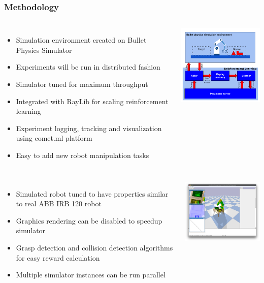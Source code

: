 \documentclass{beamer}
\begin{document}
	\begin{frame}[allowframebreaks]
		\frametitle{Methodology}
		
		\begin{columns}[c]
			\begin{itemize}
				\item Simulation environment created on Bullet Physics Simulator
				\item Experiments will be run in distributed fashion
				\item Simulator tuned for maximum throughput
				\item Integrated with RayLib for scaling reinforcement learning
				\item Experiment logging, tracking and visualization using comet.ml platform
				\item Easy to add new robot manipulation tasks
			\end{itemize}
			
			\includegraphics[width=6cm]{setup}
		\end{columns}
	
		\begin{columns}[c]
			\begin{itemize}
				\item Simulated robot tuned to have properties similar to real ABB IRB 120 robot
				\item Graphics rendering can be disabled to speedup simulator
				\item Grasp detection and collision detection algorithms for easy reward calculation
				\item Multiple simulator instances can be run parallel
			\end{itemize}
			
			\includegraphics[width=6cm]{simulator.png}
		\end{columns}
	\end{frame}
\end{document}
